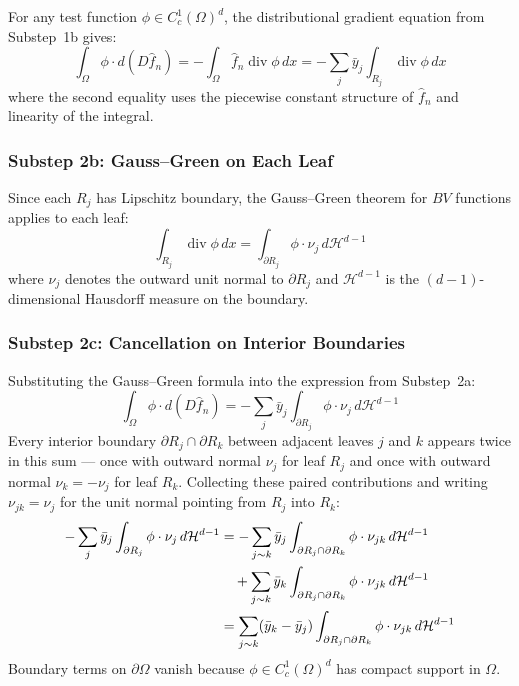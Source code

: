 \documentclass[12pt,a4paper]{article}
\numberwithin{equation}{section}
\theoremstyle{plain}
\theoremstyle{definition}
\newcommand{\fn}{\hat{f}_n}
\begin{document}
	For any test function $\phi \in C_c^1(\Omega)^d$, the distributional
	gradient equation from Substep~1b gives:
	\begin{equation}
		\int_\Omega \phi \cdot d(D\fn)
		= -\int_\Omega \fn \operatorname{div} \phi \, dx
		= -\sum_j \bar{y}_j \int_{R_j} \operatorname{div} \phi \, dx
	\end{equation}
	where the second equality uses the piecewise constant structure of $\fn$ and
	linearity of the integral.
	
	\subsubsection*{Substep 2b: Gauss--Green on Each Leaf}
	
	Since each $R_j$ has Lipschitz boundary, the Gauss--Green theorem for $BV$
	functions \citep[Theorem~5.16]{evans2015measure} applies to each leaf:
	\begin{equation}
		\int_{R_j} \operatorname{div} \phi \, dx
		= \int_{\partial R_j} \phi \cdot \nu_j \, d\mathcal{H}^{d-1}
	\end{equation}
	where $\nu_j$ denotes the outward unit normal to $\partial R_j$ and
	$\mathcal{H}^{d-1}$ is the $(d-1)$-dimensional Hausdorff measure on the
	boundary.
	
	\subsubsection*{Substep 2c: Cancellation on Interior Boundaries}
	
	Substituting the Gauss--Green formula into the expression from Substep~2a:
	\begin{equation}
		\int_\Omega \phi \cdot d(D\fn)
		= -\sum_j \bar{y}_j \int_{\partial R_j} \phi \cdot \nu_j \, d\mathcal{H}^{d-1}
	\end{equation}
	Every interior boundary $\partial R_j \cap \partial R_k$ between adjacent
	leaves $j$ and $k$ appears twice in this sum --- once with outward normal
	$\nu_j$ for leaf $R_j$ and once with outward normal $\nu_k = -\nu_j$ for
	leaf $R_k$. Collecting these paired contributions and writing $\nu_{jk} =
	\nu_j$ for the unit normal pointing from $R_j$ into $R_k$:
	\begin{align}
		-\sum_j \bar{y}_j \int_{\partial R_j} \phi \cdot \nu_j \, d\mathcal{H}^{d-1}
		&= -\sum_{j \sim k} \bar{y}_j \int_{\partial R_j \cap \partial R_k}
		\phi \cdot \nu_{jk} \, d\mathcal{H}^{d-1} \notag \\
		&\quad + \sum_{j \sim k} \bar{y}_k \int_{\partial R_j \cap \partial R_k}
		\phi \cdot \nu_{jk} \, d\mathcal{H}^{d-1} \notag \\
		&= \sum_{j \sim k} (\bar{y}_k - \bar{y}_j)
		\int_{\partial R_j \cap \partial R_k} \phi \cdot \nu_{jk}
		\, d\mathcal{H}^{d-1}
	\end{align}
	Boundary terms on $\partial\Omega$ vanish because $\phi \in C_c^1(\Omega)^d$
	has compact support in $\Omega$.
	
\end{document}
